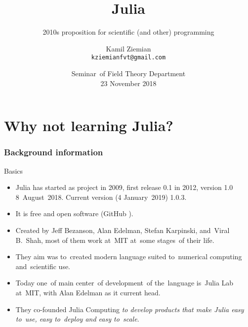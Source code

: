 \documentclass{beamer}  %
\title[]{Julia}
\subtitle{2010s proposition for scientific (and other) programming}
\author{Kamil Ziemian \\
  \texttt{kziemianfvt@gmail.com} }
\date[23 November 2018]{Seminar~of Field Theory Department \\
  23 November 2018}
\begin{document}



\begin{frame}
  \titlepage  %
\end{frame}






\section[]{Why not learning Julia?}





\begin{frame}
  \frametitle{Background information}

  \begin{block}{Basics}
    \begin{itemize}
    \item Julia has started as project in 2009, first release 0.1 in
      2012, version 1.0 8~August~2018. Current version (4
      January~2019) 1.0.3.
    \item It is free and open software (GitHub
      ).
    \item Created by Jeff Bezanson, Alan Edelman, Stefan Karpinski,
      and~Viral B.~Shah, most of them work at~MIT at~some stages~of
      their life.
    \item They aim was to~created modern language suited to~numerical
      computing and~scientific use.
    \item Today one~of main center~of development~of the~language
      is~Julia Lab at~MIT, with Alan Edelman as it current head.
    \item They co-founded Julia Computing \emph{to develop products
        that make Julia easy to~use, easy to~deploy and easy
        to~scale}.
    \end{itemize}
  \end{block}

\end{frame}
\end{document}
